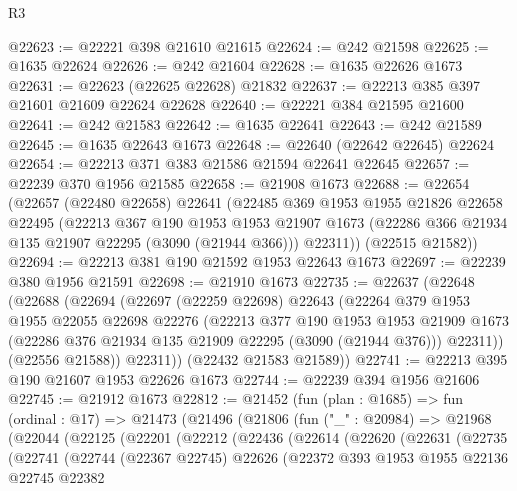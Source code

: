 \begin{lexlean}{R3}
\begin{coremodule}
@22623 := @22221 @398 @21610 @21615
@22624 := @242 @21598
@22625 := @1635 @22624
@22626 := @242 @21604
@22628 := @1635 @22626 @1673
@22631 := @22623 (@22625 @22628) @21832
@22637 := @22213 @385 @397 @21601 @21609 @22624 @22628
@22640 := @22221 @384 @21595 @21600
@22641 := @242 @21583
@22642 := @1635 @22641
@22643 := @242 @21589
@22645 := @1635 @22643 @1673
@22648 := @22640 (@22642 @22645) @22624
@22654 := @22213 @371 @383 @21586 @21594 @22641 @22645
@22657 := @22239 @370 @1956 @21585
@22658 := @21908 @1673
@22688 := @22654
    (@22657
      (@22480 @22658)
      @22641
      (@22485
        @369
        @1953
        @1955
        @21826
        @22658
        @22495
        (@22213
          @367
          @190
          @1953
          @1953
          @21907
          @1673
          (@22286 @366 @21934 @135 @21907 @22295 (@3090 (@21944 @366)))
          @22311))
      (@22515 @21582))
@22694 := @22213 @381 @190 @21592 @1953 @22643 @1673
@22697 := @22239 @380 @1956 @21591
@22698 := @21910 @1673
@22735 := @22637
    (@22648
      (@22688
        (@22694
          (@22697
            (@22259 @22698)
            @22643
            (@22264
              @379
              @1953
              @1955
              @22055
              @22698
              @22276
              (@22213
                @377
                @190
                @1953
                @1953
                @21909
                @1673
                (@22286 @376 @21934 @135 @21909 @22295 (@3090 (@21944 @376)))
                @22311))
            (@22556 @21588))
          @22311))
      (@22432 @21583 @21589))
@22741 := @22213 @395 @190 @21607 @1953 @22626 @1673
@22744 := @22239 @394 @1956 @21606
@22745 := @21912 @1673
@22812 := @21452
    (fun (plan : @1685) =>
    fun (ordinal : @17) =>
    @21473
      (@21496
        (@21806
          (fun ("_" : @20984) =>
          @21968
            (@22044
              (@22125
                (@22201
                  (@22212
                    (@22436
                      (@22614
                        (@22620
                          (@22631
                            (@22735
                              (@22741
                                (@22744
                                  (@22367 @22745)
                                  @22626
                                  (@22372
                                    @393
                                    @1953
                                    @1955
                                    @22136
                                    @22745
                                    @22382

\end{coremodule}
\end{lexlean}
